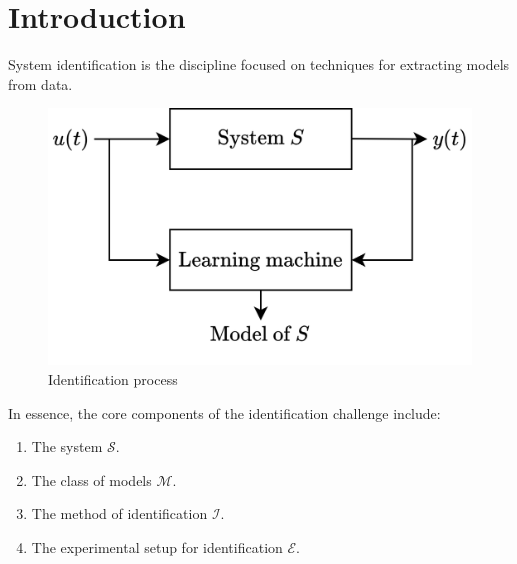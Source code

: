 \section{Introduction}

System identification is the discipline focused on techniques for extracting models from data.
\begin{figure}[H]
    \centering
    \includegraphics[width=0.6\linewidth]{images/identification.png}
    \caption{Identification process}
\end{figure}
In essence, the core components of the identification challenge include:
\begin{enumerate}
    \item The system $\mathcal{S}$. 
    \item The class of models $\mathcal{M}$. 
    \item The method of identification $\mathcal{I}$. 
    \item The experimental setup for identification $\mathcal{E}$. 
\end{enumerate}

